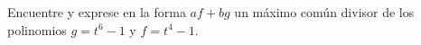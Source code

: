 

Encuentre y exprese en la forma \( af + bg \) un máximo común
divisor de los polinomios \( g = t^6 - 1 \) y \( f = t^4 - 1 \).
